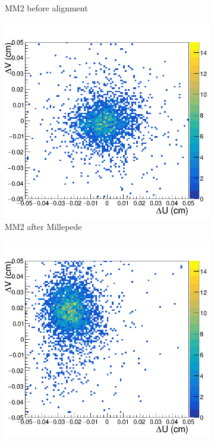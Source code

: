 \begin{figure}[h!]
\begin{subfigure}[l]{.45\textwidth}
   \caption{MM2 before alignment}
   \label{fig:MX2_before}
 \end{subfigure}
 \begin{subfigure}[r]{.45\textwidth}
   \centering
   \includegraphics[width=\linewidth]{thesis_figures/alignment/Run_3211_after_millepede/square/MX2.png}
   \caption{MM2 after Millepede}
   \label{fig:MX2_after}
 \end{subfigure}
 \begin{subfigure}[l]{.45\textwidth}
   \centering
   \includegraphics[width=\linewidth]{thesis_figures/alignment/Run_3211_before/square/MX3.png}


\end{subfigure}
\end{figure}
